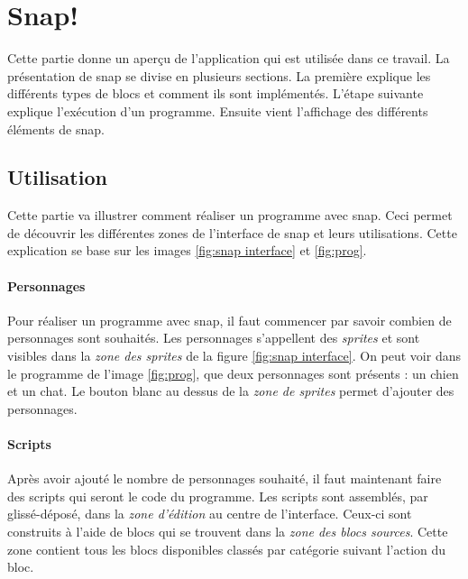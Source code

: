 \section{Snap!}
Cette partie donne un aperçu de l'application qui est utilisée dans ce travail. La présentation de \gls{snap} \cite{snap} se divise en plusieurs sections. La première explique les différents types de \glspl{bloc} et comment ils sont implémentés. L'étape suivante explique l'exécution d'un programme. Ensuite vient l'affichage des différents éléments de \gls{snap}.

\subsection{Utilisation}
Cette partie va illustrer comment réaliser un programme avec \gls{snap}. Ceci permet de découvrir les différentes zones de l'interface de \gls{snap} et leurs utilisations. Cette explication se base sur les images \ref{fig:snap interface} et \ref{fig:prog}.

\paragraph{Personnages}
Pour réaliser un programme avec \gls{snap}, il faut commencer par savoir combien de personnages sont souhaités. Les personnages s'appellent des \textit{\glspl{sprite}} et sont visibles dans la \textit{zone des \glspl{sprite}} de la figure \ref{fig:snap interface}. On peut voir dans le programme de l'image \ref{fig:prog}, que deux personnages sont présents : un chien et un chat. Le bouton blanc au dessus de la \textit{zone de \glspl{sprite}} permet d'ajouter des personnages.

\paragraph{Scripts}
Après avoir ajouté le nombre de personnages souhaité, il faut maintenant faire des \glspl{script} qui seront le code du programme. Les \glspl{script} sont assemblés, par glissé-déposé, dans la \textit{zone d'édition} au centre de l'interface. Ceux-ci sont construits à l'aide de \glspl{bloc} qui se trouvent dans la \textit{zone des \glspl{bloc} sources}. Cette zone contient tous les \glspl{bloc} disponibles classés par catégorie suivant l'action du \gls{bloc}.

